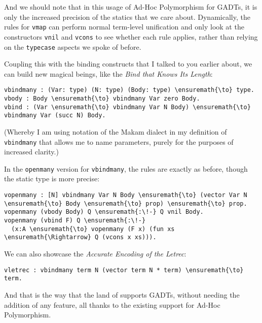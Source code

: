 And we should note that in this usage of Ad-Hoc Polymorphism for GADTs,
it is only the increased precision of the statics that we care about.
Dynamically, the rules for \texttt{vmap} can perform normal term-level
unification and only look at the constructors \texttt{vnil} and
\texttt{vcons} to see whether each rule applies, rather than relying on
the \texttt{typecase} aspects we spoke of before.

Coupling this with the binding constructs that I talked to you earlier
about, we can build new magical beings, like the \emph{Bind that Knows
Its Length}:

\begin{verbatim}
vbindmany : (Var: type) (N: type) (Body: type) \ensuremath{\to} type.
vbody : Body \ensuremath{\to} vbindmany Var zero Body.
vbind : (Var \ensuremath{\to} vbindmany Var N Body) \ensuremath{\to} vbindmany Var (succ N) Body.
\end{verbatim}

(Whereby I am using notation of the Makam dialect in my definition of
\texttt{vbindmany} that allows me to name parameters, purely for the
purposes of increased clarity.)

In the \texttt{openmany} version for \texttt{vbindmany}, the rules are
exactly as before, though the static type is more precise:

\begin{verbatim}
vopenmany : [N] vbindmany Var N Body \ensuremath{\to} (vector Var N \ensuremath{\to} Body \ensuremath{\to} prop) \ensuremath{\to} prop.
vopenmany (vbody Body) Q \ensuremath{:\!-} Q vnil Body.
vopenmany (vbind F) Q \ensuremath{:\!-}
  (x:A \ensuremath{\to} vopenmany (F x) (fun xs \ensuremath{\Rightarrow} Q (vcons x xs))).
\end{verbatim}

We can also showcase the \emph{Accurate Encoding of the Letrec}:

\begin{verbatim}
vletrec : vbindmany term N (vector term N * term) \ensuremath{\to} term.
\end{verbatim}

And that is the way that the land of \lamprolog supports GADTs, without
needing the addition of any feature, all thanks to the existing support
for Ad-Hoc Polymorphism.

\identDialog
